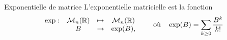 \begin{definition}{Exponentielle de matrice}
  L'exponentielle matricielle est la fonction
  $$
  \begin{array}{rccc}
    \exp: & \mathcal{M}_n(\mathbb{R}) & \mapsto & \mathcal{M}_n(\mathbb{R}) \\
      & B & \rightarrow & \exp(B),
  \end{array}
  \qquad \text{où} \quad
  \exp(B) = \sum_{k \geq 0} \frac{B^k}{k !}
  $$
\end{definition}



